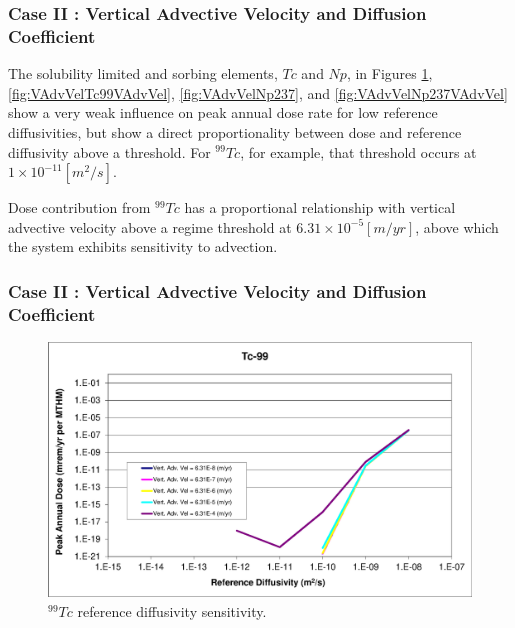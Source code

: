 \begin{frame}[c]
  \frametitle{Case II : Vertical Advective Velocity and Diffusion Coefficient}
The solubility limited and sorbing elements, $Tc$ and $Np$, in Figures 
\ref{fig:VAdvVelTc99}, \ref{fig:VAdvVelTc99VAdvVel}, \ref{fig:VAdvVelNp237}, and 
\ref{fig:VAdvVelNp237VAdvVel} show a very weak influence on peak annual dose 
rate for low reference diffusivities, but show a direct proportionality between 
dose and reference diffusivity above a threshold. For $^{99}Tc$, for example, 
that threshold occurs at $1\times10^{-11}[m^2/s]$. 


Dose contribution from $^{99}Tc$ has a proportional 
relationship with vertical advective velocity above a regime threshold at 
$6.31\times10^{-5}[m/yr]$, above which the system exhibits sensitivity to 
advection. 


\begin{frame}[c]
  \frametitle{Case II : Vertical Advective Velocity and Diffusion Coefficient}
\begin{figure}[htp!]
\centering
\includegraphics[width=\linewidth]{AdvVelAndDiffCoeffEBSFail/Tc-99.eps}
\caption{$^{99}Tc$ reference diffusivity sensitivity.}
\label{fig:VAdvVelTc99}
\end{figure}
\end{frame}


\end{frame}
